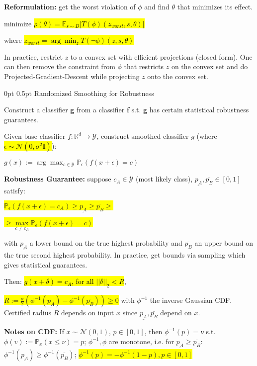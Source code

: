 \documentclass[11pt,landscape,a4paper,fleqn]{article}
\makeatletter
\renewcommand{\section}{\@startsection{section}{1}{0mm}%
                                {0pt}%
                                {0.5pt}%
                                {\color{myorange}\sffamily\small\bfseries}}
\newcommand{\mhl}[1]{\setlength{\fboxsep}{0pt}\colorbox{yellow}{#1}}
\makeatother
\begin{document}
\begin{multicols*}{4}
\textbf{Reformulation:} get the worst violation of $\phi$ and find $\theta$ that minimizes its effect.

minimize \hl{$\rho(\theta) = \mathbb{E}_{s \sim D} \big[ T(\phi)(z_{worst}, s, \theta) \big]$}

where \hl{$z_{worst} = \arg \min_z T(\lnot \phi)(z, s, \theta)$}

In practice, restrict $z$ to a convex set with efficient projections (closed form). One can then remove the constraint from $\phi$ that restricts $z$ on the convex set and do Projected-Gradient-Descent while projecting $z$ onto the convex set.


\vspace*{1mm}
\section{Randomized Smoothing for Robustness}

Construct a classifier \textbf{g} from a classifier \textbf{f} s.t. \textbf{g} has certain statistical robustness guarantees.

Given base classifier $f: \mathbb{R}^d \rightarrow \mathcal{Y}$, construct smoothed classifier $g$ (where \hl{$\epsilon \sim \mathcal{N}(0, \sigma^2 \mathbf{I})$}):

$g(x) := \arg \max_{c \in \mathcal{Y}} \mathbb{P}_\epsilon (f(x + \epsilon) = c)$

\vspace*{1mm}
\textbf{Robustness Guarantee:} suppose $c_A \in \mathcal{Y}$ (most likely class), $\underline{p_A}, \overline{p_B} \in [0,1]$ satisfy:

\mhl{$\mathbb{P}_\epsilon(f(x + \epsilon) = c_A) \geq \underline{p_A} \geq \overline{p_B} \geq$}

\mhl{$\geq \max\limits_{c \neq c_A} \mathbb{P}_\epsilon (f(x + \epsilon) = c)$}

with $\underline{p_A}$ a lower bound on the true highest probability and $\overline{p_B}$ an upper bound on the true second highest probability. In practice, get bounds via sampling which gives statistical guarantees.

Then: \hl{$g(x + \delta) = c_A$, for all $||\delta||_2 < R$}, 

\mhl{$R := \frac{\sigma}{2}(\phi^{-1}(\underline{p_A}) - \phi^{-1}(\overline{p_B})) \geq 0$} with $\phi^{-1}$ the inverse Gaussian CDF. Certified radius $R$ depends on input $x$ since $\underline{p_A}, \overline{p_B}$ depend on $x$.

\vspace*{1mm}
\textbf{Notes on CDF:} If $x \sim \mathcal{N}(0,1)$, $p \in [0,1]$, then $\phi^{-1}(p) = \nu$ s.t. $\phi(v) :=\mathbb{P}_x (x \leq \nu) = p$; $\phi^{-1}, \phi$ are monotone, i.e. for $\underline{p_A} \geq \overline{p_B}$: $\phi^{-1}(\underline{p_A}) \geq \phi^{-1}(\overline{p_B})$;
\mhl{$\phi^{-1}(p) = -\phi^{-1}(1-p), p \in [0,1]$}


\end{multicols*}
\end{document}
